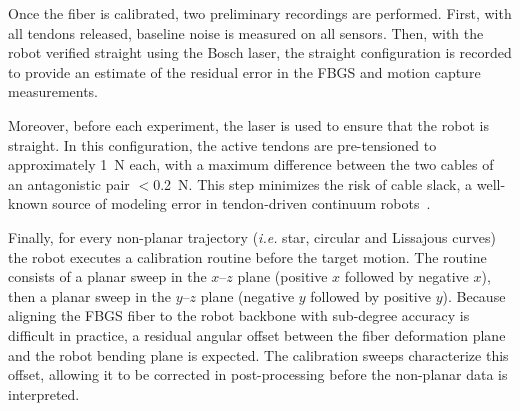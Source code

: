 \documentclass[14pt, a4paper]{article}
\newcommand{\ie}{\textit{i.e.}}
\begin{document}
Once the fiber is calibrated, two preliminary recordings are performed. 
First, with all tendons released, baseline noise is measured on all sensors. 
Then, with the robot verified straight using the Bosch laser, the straight configuration is recorded to provide an estimate of the residual error in the FBGS and motion capture measurements.


Moreover, before each experiment, the laser is used to ensure that the robot is straight.
In this configuration, the active tendons are pre-tensioned to approximately \SI{1}{\newton} each, with a maximum difference between the two cables of an antagonistic pair $<$\SI{0.2}{\newton}.
This step minimizes the risk of cable slack, a well-known source of modeling error in tendon-driven continuum robots~\cite{Rucker2011a}.


Finally, for every non-planar trajectory (\ie{} star, circular and Lissajous curves) the robot executes a calibration routine before the target motion.
The routine consists of a planar sweep in the $x$--$z$ plane (positive $x$ followed by negative $x$), then a planar sweep in the $y$--$z$ plane (negative $y$ followed by positive $y$).
Because aligning the FBGS fiber to the robot backbone with sub-degree accuracy is difficult in practice, a residual angular offset between the fiber deformation plane and the robot bending plane is expected.
The calibration sweeps characterize this offset, allowing it to be corrected in post-processing before the non-planar data is interpreted.
\end{document}
